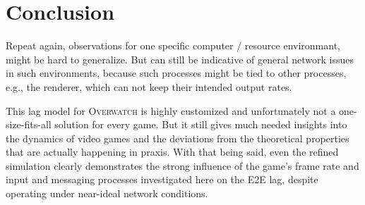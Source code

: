 \section{Conclusion}
\label{sec:conclusion}

Repeat again, observations for one specific computer / resource environmant, might be hard to generalize. But can still be indicative of general network issues in such environments, because such processes might be tied to other processes, e.g., the renderer, which can not keep their intended output rates.

This lag model for \textsc{Overwatch} is highly customized and unfortunately not a one-size-fits-all solution for every game. But it still gives much needed insights into the dynamics of video games and the deviations from the theoretical properties that are actually happening in praxis. With that being said, even the refined simulation clearly demonstrates the strong influence of the game's frame rate and input and messaging processes investigated here on the \gls{E2E} lag, despite operating under near-ideal network conditions.